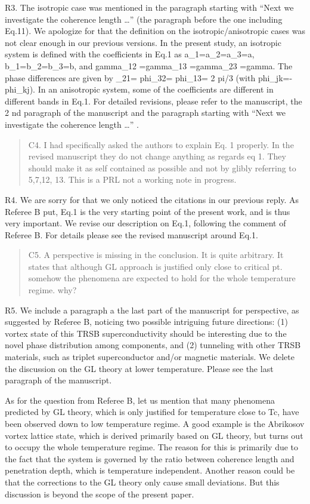\documentclass[11pt]{article}
\begin{document}
R3. The isotropic case was mentioned in the paragraph starting with
``Next we investigate the coherence length \ldots{}'' (the paragraph
before the one including Eq.11). We apologize for that the definition on
the isotropic/anisotropic cases was not clear enough in our previous
versions. In the present study, an isotropic system is defined with the
coefficients in Eq.1 as a\_1=a\_2=a\_3=a, b\_1=b\_2=b\_3=b, and
gamma\_12 =gamma\_13 =gamma\_23 =gamma. The phase differences are given
by \phi\_21= phi\_32= phi\_13= 2 pi/3 (with phi\_jk=-phi\_kj). In an
anisotropic system, some of the coefficients are different in different
bands in Eq.1. For detailed revisions, please refer to the manuscript,
the 2 nd paragraph of the manuscript and the paragraph starting with
``Next we investigate the coherence length \ldots{}'' .

\begin{quote}
C4. I had specifically asked the authors to explain Eq. 1 properly. In
the revised manuscript they do not change anything as regards eq 1. They
should make it as self contained as possible and not by glibly referring
to 5,7,12, 13. This is a PRL not a working note in progress.
\end{quote}

R4. We are sorry for that we only noticed the citations in our previous
reply. As Referee B put, Eq.1 is the very starting point of the present
work, and is thus very important. We revise our description on Eq.1,
following the comment of Referee B. For details please see the revised
manuscript around Eq.1.

\begin{quote}
C5. A perspective is missing in the conclusion. It is quite arbitrary.
It states that although GL approach is justified only close to critical
pt. somehow the phenomena are expected to hold for the whole temperature
regime. why?
\end{quote}

R5. We include a paragraph a the last part of the manuscript for
perspective, as suggested by Referee B, noticing two possible intriguing
future directions: (1) vortex state of this TRSB superconductivity
should be interesting due to the novel phase distribution among
components, and (2) tunneling with other TRSB materials, such as triplet
superconductor and/or magnetic materials. We delete the discussion on
the GL theory at lower temperature. Please see the last paragraph of the
manuscript.

As for the question from Referee B, let us mention that many phenomena
predicted by GL theory, which is only justified for temperature close to
Tc, have been observed down to low temperature regime. A good example is
the Abrikosov vortex lattice state, which is derived primarily based on
GL theory, but turns out to occupy the whole temperature regime. The
reason for this is primarily due to the fact that the system is governed
by the ratio between coherence length and penetration depth, which is
temperature independent. Another reason could be that the corrections to
the GL theory only cause small deviations. But this discussion is beyond
the scope of the present paper.
\end{document}
